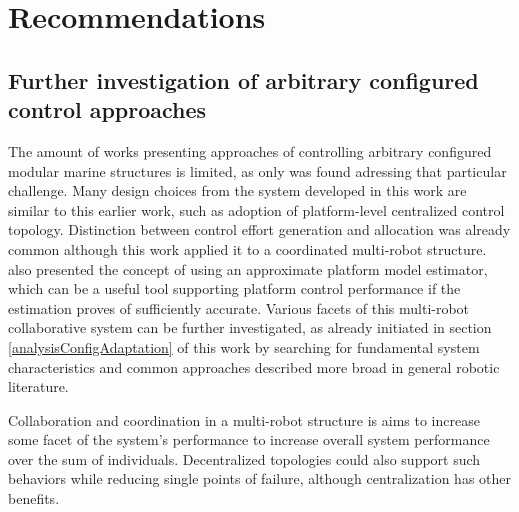 \section{Recommendations}
\subsection*{Further investigation of arbitrary configured control approaches}
The amount of works presenting approaches of controlling arbitrary configured modular marine structures is limited, as only \citet{park2019coordinated} was found adressing that particular challenge. Many design choices from the system developed in this work are similar to this earlier work, such as adoption of platform-level centralized control topology. Distinction between control effort generation and allocation was already common although this work applied it to a coordinated multi-robot structure. \citet{park2019coordinated} also presented the concept of using an approximate platform model estimator, which can be a useful tool supporting platform control performance if the estimation proves of sufficiently accurate. Various facets of this multi-robot collaborative system can be further investigated, as already initiated in section \ref{analysisConfigAdaptation} of this work by searching for fundamental system characteristics and common approaches described more broad in general robotic literature. 

Collaboration and coordination in a multi-robot structure is aims to increase some facet of the system's performance to increase overall system performance over the sum of individuals. Decentralized topologies could also support such behaviors while reducing single points of failure, although centralization has other benefits. 

